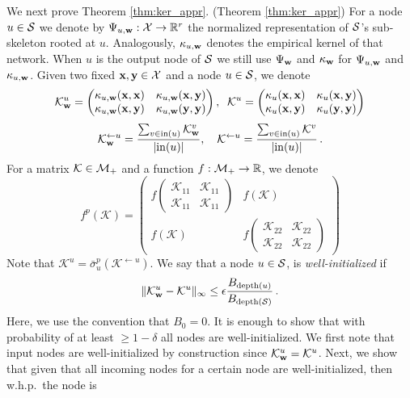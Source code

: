 \noindent We next prove Theorem \ref{thm:ker_appr}.
\proof (Theorem \ref{thm:ker_appr})
For a node $u\in{\cal S}$ we denote by $\Psi_{u,{\mathbf w}}:{\cal X}\to{\mathbb R}^r$ the normalized
representation of ${\cal S}$'s sub-skeleton rooted at $u$.
Analogously, $\kappa_{u,{\mathbf w}}$ denotes the empirical kernel of that network.
When $u$ is the output node of ${\cal S}$ we still use $\Psi_{{\mathbf w}}$ and $\kappa_{\mathbf w}$
for $\Psi_{u,{\mathbf w}}$ and $\kappa_{u,{\mathbf w}}$. Given two fixed ${\mathbf x},{\mathbf y}\in{\cal X}$ and a node
$u\in{\cal S}$, we denote
\[
\mathcal{K}_{\mathbf w}^u=
\begin{pmatrix}
\kappa_{u,{\mathbf w}}({\mathbf x},{\mathbf x}) &
\kappa_{u,{\mathbf w}}({\mathbf x},{\mathbf y})
\\
\kappa_{u,{\mathbf w}}({\mathbf x},{\mathbf y}) &
\kappa_{u,{\mathbf w}}({\mathbf y},{\mathbf y})
\end{pmatrix},\;\; \mathcal{K}^u = \begin{pmatrix}
\kappa_u({\mathbf x},{\mathbf x}) & \kappa_u({\mathbf x},{\mathbf y})
\\
\kappa_u({\mathbf x},{\mathbf y}) & \kappa_u({\mathbf y},{\mathbf y})
\end{pmatrix}
\]
\[
\mathcal{K}_{\mathbf w}^{\leftarrow u}=\frac{\sum_{v\in\mathrm{in}(u)}\mathcal{K}^{v}_{\mathbf w}}{|\mathrm{in}(u)|}
,\quad \mathcal{K}^{\leftarrow u}=\frac{\sum_{v\in\mathrm{in}(u)}\mathcal{K}^{v}}{|\mathrm{in}(u)|} \,.
\]
For a matrix $\mathcal{K}\in{\cal M}_+$ and a function $f:{\cal M}_+\to{\mathbb R}$, we denote
\[
f^p(\mathcal{K})=\begin{pmatrix}
f\!\begin{pmatrix}
\mathcal{K}_{11} & \mathcal{K}_{11}
\\
\mathcal{K}_{11} & \mathcal{K}_{11}
\end{pmatrix} & f(\mathcal{K})
\\
f(\mathcal{K}) & f\!\begin{pmatrix}
\mathcal{K}_{22} & \mathcal{K}_{22}
\\
\mathcal{K}_{22} & \mathcal{K}_{22}
\end{pmatrix}
\end{pmatrix}
\]
Note that $\mathcal{K}^u=\bar\sigma_u^p(\mathcal{K}^{\leftarrow u})$.
We say that a node $u\in {\cal S}$, is {\em well-initialized} if
\begin{equation}\label{eq:1}
\|\mathcal{K}_{\mathbf w}^u- \mathcal{K}^u\|_\infty
	\le \epsilon\frac{B_{\mathrm{depth}(u)}}{B_{\mathrm{depth}({\cal S})}} \,.
\end{equation}
Here, we use the convention that $B_{0}=0$. It is enough to show that with
probability of at least $\ge 1-\delta$ all nodes are well-initialized. We first note that input nodes are well-initialized by construction since
$\mathcal{K}^u_{\mathbf w}=\mathcal{K}^u$. Next, we show that given that all incoming
nodes for a certain node are well-initialized, then w.h.p.\ the node is
